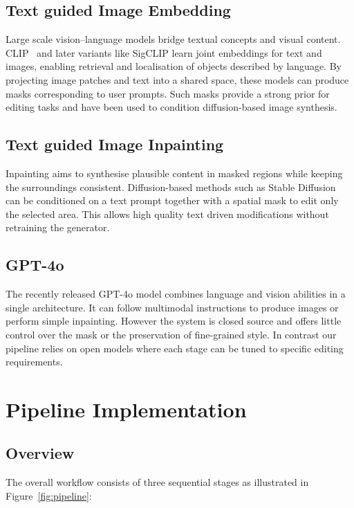 \documentclass{article}
\begin{document}
\subsection{Text guided Image Embedding}


Large scale vision--language models bridge textual concepts and visual content.
CLIP~\cite{radford2021clip} and later variants like SigCLIP learn joint
embeddings for text and images, enabling retrieval and localisation of objects
described by language. By projecting image patches and text into a shared space,
these models can produce masks corresponding to user prompts. Such masks provide
a strong prior for editing tasks and have been used to condition diffusion-based
image synthesis.


\subsection{Text guided Image Inpainting}


Inpainting aims to synthesise plausible content in masked regions while keeping
the surroundings consistent. Diffusion-based methods such as Stable
Diffusion~\cite{rombach2022stable} can be conditioned on a text prompt together
with a spatial mask to edit only the selected area. This allows high quality
text driven modifications without retraining the generator.


\subsection{GPT-4o}


The recently released GPT-4o model combines language and vision abilities in a
single architecture. It can follow multimodal instructions to produce images or
perform simple inpainting. However the system is closed source and offers little
control over the mask or the preservation of fine-grained style. In contrast our
pipeline relies on open models where each stage can be tuned to specific editing
requirements.


\section{Pipeline Implementation}


\subsection{Overview}


The overall workflow consists of three sequential stages as illustrated in
Figure~\ref{fig:pipeline}:
\end{document}
